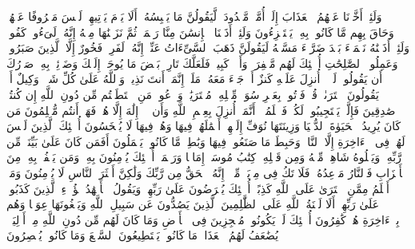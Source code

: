 \stopbuffer
\startbuffer[\q:11:8]
وَلَئِنۡ أَخَّرۡنَا عَنۡهُمُ ٱلۡعَذَابَ إِلَىٰۤ أُمَّةࣲ مَّعۡدُودَةࣲ لَّیَقُولُنَّ مَا یَحۡبِسُهُۥۤۗ أَلَا یَوۡمَ یَأۡتِیهِمۡ لَیۡسَ مَصۡرُوفًا عَنۡهُمۡ وَحَاقَ بِهِم مَّا كَانُوا۟ بِهِۦ یَسۡتَهۡزِءُونَ%
\stopbuffer
\startbuffer[\q:11:9]
وَلَئِنۡ أَذَقۡنَا ٱلۡإِنسَٰنَ مِنَّا رَحۡمَةࣰ ثُمَّ نَزَعۡنَٰهَا مِنۡهُ إِنَّهُۥ لَیَءُوسࣱ كَفُورࣱ%
\stopbuffer
\startbuffer[\q:11:10]
وَلَئِنۡ أَذَقۡنَٰهُ نَعۡمَاۤءَ بَعۡدَ ضَرَّاۤءَ مَسَّتۡهُ لَیَقُولَنَّ ذَهَبَ ٱلسَّیِّءَاتُ عَنِّیۤۚ إِنَّهُۥ لَفَرِحࣱ فَخُورٌ%
\stopbuffer
\startbuffer[\q:11:11]
إِلَّا ٱلَّذِینَ صَبَرُوا۟ وَعَمِلُوا۟ ٱلصَّٰلِحَٰتِ أُو۟لَٰۤئِكَ لَهُم مَّغۡفِرَةࣱ وَأَجۡرࣱ كَبِیرࣱ%
\stopbuffer
\startbuffer[\q:11:12]
فَلَعَلَّكَ تَارِكُۢ بَعۡضَ مَا یُوحَىٰۤ إِلَیۡكَ وَضَاۤئِقُۢ بِهِۦ صَدۡرُكَ أَن یَقُولُوا۟ لَوۡلَاۤ أُنزِلَ عَلَیۡهِ كَنزٌ أَوۡ جَاۤءَ مَعَهُۥ مَلَكٌۚ إِنَّمَاۤ أَنتَ نَذِیرࣱۚ وَٱللَّهُ عَلَىٰ كُلِّ شَیۡءࣲ وَكِیلٌ%
\stopbuffer
\startbuffer[\q:11:13]
أَمۡ یَقُولُونَ ٱفۡتَرَىٰهُۖ قُلۡ فَأۡتُوا۟ بِعَشۡرِ سُوَرࣲ مِّثۡلِهِۦ مُفۡتَرَیَٰتࣲ وَٱدۡعُوا۟ مَنِ ٱسۡتَطَعۡتُم مِّن دُونِ ٱللَّهِ إِن كُنتُمۡ صَٰدِقِینَ%
\stopbuffer
\startbuffer[\q:11:14]
فَإِلَّمۡ یَسۡتَجِیبُوا۟ لَكُمۡ فَٱعۡلَمُوۤا۟ أَنَّمَاۤ أُنزِلَ بِعِلۡمِ ٱللَّهِ وَأَن لَّاۤ إِلَٰهَ إِلَّا هُوَۖ فَهَلۡ أَنتُم مُّسۡلِمُونَ%
\stopbuffer
\startbuffer[\q:11:15]
مَن كَانَ یُرِیدُ ٱلۡحَیَوٰةَ ٱلدُّنۡیَا وَزِینَتَهَا نُوَفِّ إِلَیۡهِمۡ أَعۡمَٰلَهُمۡ فِیهَا وَهُمۡ فِیهَا لَا یُبۡخَسُونَ%
\stopbuffer
\startbuffer[\q:11:16]
أُو۟لَٰۤئِكَ ٱلَّذِینَ لَیۡسَ لَهُمۡ فِی ٱلۡءَاخِرَةِ إِلَّا ٱلنَّارُۖ وَحَبِطَ مَا صَنَعُوا۟ فِیهَا وَبَٰطِلࣱ مَّا كَانُوا۟ یَعۡمَلُونَ%
\stopbuffer
\startbuffer[\q:11:17]
أَفَمَن كَانَ عَلَىٰ بَیِّنَةࣲ مِّن رَّبِّهِۦ وَیَتۡلُوهُ شَاهِدࣱ مِّنۡهُ وَمِن قَبۡلِهِۦ كِتَٰبُ مُوسَىٰۤ إِمَامࣰا وَرَحۡمَةًۚ أُو۟لَٰۤئِكَ یُؤۡمِنُونَ بِهِۦۚ وَمَن یَكۡفُرۡ بِهِۦ مِنَ ٱلۡأَحۡزَابِ فَٱلنَّارُ مَوۡعِدُهُۥۚ فَلَا تَكُ فِی مِرۡیَةࣲ مِّنۡهُۚ إِنَّهُ ٱلۡحَقُّ مِن رَّبِّكَ وَلَٰكِنَّ أَكۡثَرَ ٱلنَّاسِ لَا یُؤۡمِنُونَ%
\stopbuffer
\startbuffer[\q:11:18]
وَمَنۡ أَظۡلَمُ مِمَّنِ ٱفۡتَرَىٰ عَلَى ٱللَّهِ كَذِبًاۚ أُو۟لَٰۤئِكَ یُعۡرَضُونَ عَلَىٰ رَبِّهِمۡ وَیَقُولُ ٱلۡأَشۡهَٰدُ هَٰۤؤُلَاۤءِ ٱلَّذِینَ كَذَبُوا۟ عَلَىٰ رَبِّهِمۡۚ أَلَا لَعۡنَةُ ٱللَّهِ عَلَى ٱلظَّٰلِمِینَ%
\stopbuffer
\startbuffer[\q:11:19]
ٱلَّذِینَ یَصُدُّونَ عَن سَبِیلِ ٱللَّهِ وَیَبۡغُونَهَا عِوَجࣰا وَهُم بِٱلۡءَاخِرَةِ هُمۡ كَٰفِرُونَ%
\stopbuffer
\startbuffer[\q:11:20]
أُو۟لَٰۤئِكَ لَمۡ یَكُونُوا۟ مُعۡجِزِینَ فِی ٱلۡأَرۡضِ وَمَا كَانَ لَهُم مِّن دُونِ ٱللَّهِ مِنۡ أَوۡلِیَاۤءَۘ یُضَٰعَفُ لَهُمُ ٱلۡعَذَابُۚ مَا كَانُوا۟ یَسۡتَطِیعُونَ ٱلسَّمۡعَ وَمَا كَانُوا۟ یُبۡصِرُونَ%
